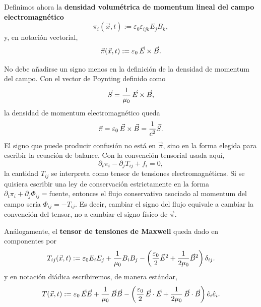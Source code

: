 \documentclass[../main.tex]{subfiles}
\begin{document}
Definimos ahora la \textbf{densidad volumétrica de momentum lineal del campo electromagnético}
\begin{equation}
    \pi_i(\vec x,t):=\varepsilon_0\varepsilon_{ijk}E_jB_k,
    \label{eq:momentum-density-indicial}
\end{equation}
y, en notación vectorial,
\begin{equation}
    \vec\pi(\vec x,t):=\varepsilon_0\,\vec{E}\times\vec{B}.
    \label{eq:momentum-density-diadic}
\end{equation}
\begin{cuidado}
No debe añadirse un signo menos en la definición de la densidad de momentum del campo. Con el vector de Poynting definido como
\begin{equation*}
    \vec S=\frac{1}{\mu_0}\,\vec{E}\times\vec{B},
\end{equation*}
la densidad de momentum electromagnético queda
\begin{equation*}
    \vec\pi=\varepsilon_0\,\vec{E}\times\vec{B}=\frac{1}{c^2}\vec S.
\end{equation*}
El signo que puede producir confusión no está en $\vec\pi$, sino en la forma elegida para escribir la ecuación de balance. Con la convención tensorial usada aquí,
\begin{equation*}
    \partial_t\pi_i-\partial_jT_{ij}+f_i=0,
\end{equation*}
la cantidad $T_{ij}$ se interpreta como tensor de tensiones electromagnéticas. Si se quisiera escribir una ley de conservación estrictamente en la forma $\partial_t\pi_i+\partial_j\Phi_{ij}=\text{fuente}$, entonces el flujo conservativo asociado al momentum del campo sería $\Phi_{ij}=-T_{ij}$. Es decir, cambiar el signo del flujo equivale a cambiar la convención del tensor, no a cambiar el signo físico de $\vec\pi$.
\end{cuidado}
Análogamente, el \textbf{tensor de tensiones de Maxwell} queda dado en componentes por
\begin{equation}
    T_{ij}(\vec x,t)
    :=
    \varepsilon_0E_iE_j
    +
    \frac{1}{\mu_0}B_iB_j
    -
    \left(
        \frac{\varepsilon_0}{2}\vec{E}^2
        +
        \frac{1}{2\mu_0}\vec{B}^2
    \right)\delta_{ij}.
    \label{eq:maxwell-stress-tensor}
\end{equation}
y en notación diádica escribiremos, de manera estándar,
\begin{equation}
    T(\vec x,t)
    :=
    \varepsilon_0\,\vec{E}\vec{E}
    +
    \frac{1}{\mu_0}\,\vec{B}\vec{B}
    -
    \left(
        \frac{\varepsilon_0}{2}\,\vec{E}\cdot\vec{E}
        +
        \frac{1}{2\mu_0}\,\vec{B}\cdot\vec{B}
    \right)\hat e_i\hat e_i.
    \label{eq:maxwell-stress-tensor-diadic}
\end{equation}
\end{document}
